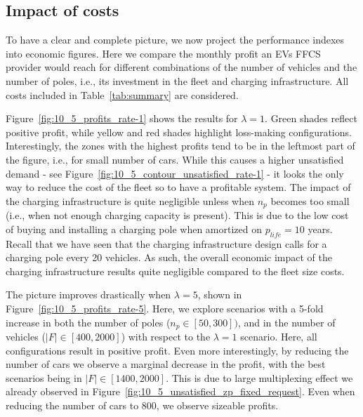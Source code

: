 \subsection{Impact of costs}







To have a clear and complete picture, we now project the performance indexes into economic figures. Here we compare the monthly profit an EVs FFCS provider would reach for different combinations of the number of vehicles and the number of poles, i.e., its investment in the fleet and charging infrastructure. All costs included in Table~\ref{tab:summary} are considered.

Figure~\ref{fig:10_5_profits_rate-1} shows the results for $\lambda=1$. Green shades reflect positive profit, while yellow and red shades highlight loss-making configurations. Interestingly, the zones with the highest profits tend to be in the leftmost part of the figure, i.e., for small number of cars. While this causes a higher unsatisfied demand - see Figure~\ref{fig:10_5_contour_unsatisfied_rate-1} - it looks the only way to reduce the cost of the fleet so to have a profitable system. The impact of the charging infrastructure is quite negligible unless when $n_p$ becomes too small (i.e., when not enough charging capacity is present). This is due to the low cost of buying and installing a charging pole when amortized on $p_{life}=10$ years. Recall that we have seen that the charging infrastructure design calls for a charging pole every 20 vehicles. As such, the overall economic impact of the charging infrastructure results quite negligible compared to the fleet size costs.

The picture improves drastically when $\lambda=5$, shown in Figure~\ref{fig:10_5_profits_rate-5}. Here, we explore scenarios with a 5-fold increase in both the number of poles ($n_p\in[50,300])$, and in the number of vehicles ($|F|\in[400,2000]$) with respect to the $\lambda=1$ scenario. Here, all configurations result in positive profit. Even more interestingly, by reducing the number of cars we observe a marginal decrease in the profit, with the best scenarios being in $|F|\in[1400, 2000]$. This is due to large multiplexing effect we already observed in Figure~\ref{fig:10_5_unsatisfied_zp_fixed_request}. Even when reducing the number of cars to 800, we observe sizeable profits.

